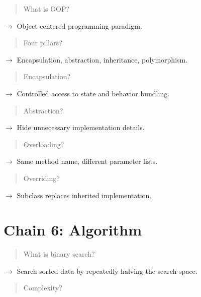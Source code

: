 \begin{quote}
What is OOP?\\
\end{quote}

$\rightarrow$ Object-centered programming paradigm.

\begin{quote}
Four pillars?\\
\end{quote}

$\rightarrow$ Encapsulation, abstraction, inheritance, polymorphism.

\begin{quote}
Encapsulation?\\
\end{quote}

$\rightarrow$ Controlled access to state and behavior bundling.

\begin{quote}
Abstraction?\\
\end{quote}

$\rightarrow$ Hide unnecessary implementation details.

\begin{quote}
Overloading?\\
\end{quote}

$\rightarrow$ Same method name, different parameter lists.

\begin{quote}
Overriding?\\
\end{quote}

$\rightarrow$ Subclass replaces inherited implementation.

\medskip

\section{Chain 6: Algorithm}

\begin{quote}
What is binary search?\\
\end{quote}

$\rightarrow$ Search sorted data by repeatedly halving the search space.

\begin{quote}
Complexity?\\
\end{quote}

